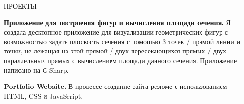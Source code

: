 \documentclass{resume}
\begin{document}

\begin{rSection}{ПРОЕКТЫ}
\vspace{-1.25em}
\item \textbf{Приложение для построения фигур и вычисления площади сечения.} {Я создала десктопное приложение для визуализации геометрических фигур с возможностью задать плоскость сечения с помошью 3 точек / прямой линии и точки, не лежащая на этой прямой / двух пересекающихся прямых / двух параллельных прямых с вычислением площади данного сечения. Приложение написано на С Sharp.}
\item \textbf{Portfolio Website.} {В процессе создание сайта-резюме с использованием HTML, CSS и JavaScript.}
\end{rSection} 
\end{document}

